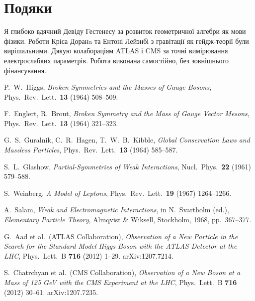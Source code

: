 \documentclass[11pt,a4paper]{article}
\theoremstyle{definition}
\theoremstyle{plain}
\theoremstyle{remark}
\begin{document}
\vspace{1em}

\section*{Подяки}

Я глибоко вдячний Девіду Гестенесу за розвиток геометричної алгебри як мови фізики. Роботи Кріса Доранa та Ентоні Лейзнбі з гравітації як гейдж-теорії були вирішальними. Дякую колабораціям ATLAS і CMS за точні вимірювання електрослабких параметрів. Робота виконана самостійно, без зовнішнього фінансування.

\vspace{1em}

\begin{thebibliography}{99}\setlength{\itemsep}{3pt}

P.~W.~Higgs, \emph{Broken Symmetries and the Masses of Gauge Bosons}, Phys.\ Rev.\ Lett.\ \textbf{13} (1964) 508--509.

F.~Englert, R.~Brout, \emph{Broken Symmetry and the Mass of Gauge Vector Mesons}, Phys.\ Rev.\ Lett.\ \textbf{13} (1964) 321--323.

G.~S.~Guralnik, C.~R.~Hagen, T.~W.~B.~Kibble, \emph{Global Conservation Laws and Massless Particles}, Phys.\ Rev.\ Lett.\ \textbf{13} (1964) 585--587.

S.~L.~Glashow, \emph{Partial-Symmetries of Weak Interactions}, Nucl.\ Phys.\ \textbf{22} (1961) 579--588.

S.~Weinberg, \emph{A Model of Leptons}, Phys.\ Rev.\ Lett.\ \textbf{19} (1967) 1264--1266.

A.~Salam, \emph{Weak and Electromagnetic Interactions}, in N.~Svartholm (ed.), \textit{Elementary Particle Theory}, Almqvist \& Wiksell, Stockholm, 1968, pp.~367--377.

G.~Aad et al.\ (ATLAS Collaboration), \emph{Observation of a New Particle in the Search for the Standard Model Higgs Boson with the ATLAS Detector at the LHC}, Phys.\ Lett.\ B \textbf{716} (2012) 1--29. arXiv:1207.7214.

S.~Chatrchyan et al.\ (CMS Collaboration), \emph{Observation of a New Boson at a Mass of 125 GeV with the CMS Experiment at the LHC}, Phys.\ Lett.\ B \textbf{716} (2012) 30--61. arXiv:1207.7235.


\end{thebibliography}
\end{document}
